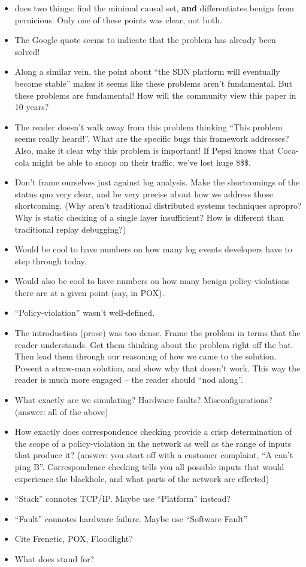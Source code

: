 \begin{itemize}
\item \simulator{} does two things: find the minimal causal set, {\bf and}
differentiates benign from pernicious. Only one of these points was clear, not
both.
\item The Google quote seems to indicate that the problem has already been solved!
\item Along a similar vein, the point about ``the SDN platform will eventually
become stable'' makes it seems like these problems aren't fundamental. But
these problems are fundamental! How will the community view this paper in 10
years?
\item The reader doesn't walk away from this problem thinking ``This problem
seems really heard!''. What are the specific bugs this framework addresses?
Also, make it clear why this problem is important! If Pepsi knows that
Coca-cola might be able to snoop on their traffic, we've lost huge \$\$\$.
\item Don't frame ourselves just against log analysis. Make 
the shortcomings of the status quo very clear, and be very precise about how
we address those shortcoming. (Why aren't traditional distributed systems
techniques apropro? Why is static checking of a single layer insufficient? How
is \simulator{} different than traditional replay debugging?)
\item Would be cool to have numbers on how many log events developers have to
step through today.
\item Would also be cool to have numbers on how many benign policy-violations
there are at a given point (say, in POX).
\item ``Policy-violation'' wasn't well-defined.
\item The introduction (prose) was too dense. Frame the problem in terms that
the reader understands. Get them thinking about the problem right off the bat.
Then lead them through our reasoning of how we came to the solution. Present
a straw-man solution, and show why that doesn't work. This way
the reader is much more engaged -- the reader should ``nod along''.
\item What exactly are we simulating? Hardware faults? Misconfigurations?
(answer: all of the above)
\item How exactly does correspondence checking provide a crisp determination of the scope of a policy-violation in the
network as well as the range of inputs that produce it? (answer: you start off
with a customer complaint, ``A can't ping B''. Correspondence checking tells
you all possible inputs that would experience the blackhole, and what parts of
the network are effected)
\item ``Stack'' connotes TCP/IP. Maybe use ``Platform'' instead?
\item ``Fault'' connotes hardware failure. Maybe use ``Software Fault''
\item Cite Frenetic, POX, Floodlight?
\item What does \projectname{} stand for?
\end{itemize}

